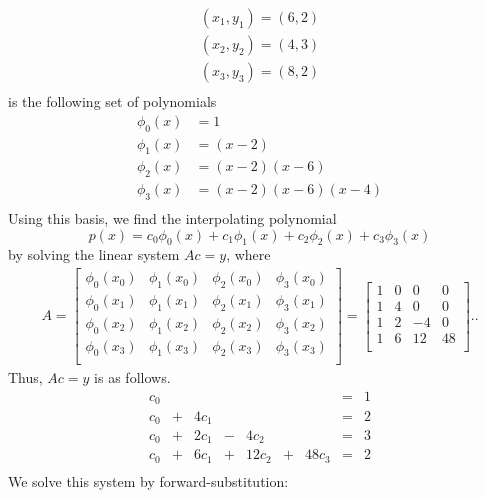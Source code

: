 \documentclass{report}
\begin{document}
\begin{itemize}
\begin{align*}
        (x_1,y_1) = (6,2)\\
        (x_2, y_2) = (4,3)\\
        (x_3, y_3) = (8,2)\\
    \end{align*}
    is the following set of polynomials
    \begin{align*}
        \phi_0(x) & = 1 \\
        \phi_1(x) & = (x-2) \\
        \phi_2(x) & = (x-2)(x-6) \\
        \phi_3(x) & = (x-2)(x-6)(x-4) \\
    \end{align*}
    Using this basis, we find the interpolating polynomial
    $$p(x) = c_0 \phi_0(x) + c_1 \phi_1(x) + c_2 \phi_2(x) + c_3 \phi_3(x)$$
    by solving the linear system $Ac = y$, where
    \begin{align*}
        A = 
        \begin{bmatrix}
            \phi_0(x_0) & \phi_1(x_0) & \phi_2(x_0) & \phi_3(x_0)\\
            \phi_0(x_1) & \phi_1(x_1) & \phi_2(x_1) & \phi_3(x_1)\\
            \phi_0(x_2) & \phi_1(x_2) & \phi_2(x_2) & \phi_3(x_2)\\
            \phi_0(x_3) & \phi_1(x_3) & \phi_2(x_3) & \phi_3(x_3)\\
        \end{bmatrix} =
        \begin{bmatrix}
            1 & 0 & 0 & 0 \\
            1 & 4 & 0 & 0 \\
            1 & 2 & -4 & 0 \\
            1 & 6 & 12 & 48 \\
        \end{bmatrix}.
    .\end{align*}
    Thus, $Ac = y$ is as follows.
    $$
    \begin{matrix}
        c_0 & &       & &       & &       &=& 1 \\
        c_0 &+& 4 c_1 & &       & &       &=& 2 \\
        c_0 &+& 2 c_1 &-& 4c_2  & &       &=& 3 \\
        c_0 &+& 6 c_1 &+& 12c_2 &+& 48c_3 &=& 2 \\
    \end{matrix}
    $$
    We solve this system by forward-substitution:
    \begin{align*}

\end{align*}
\end{itemize}
\end{document}
